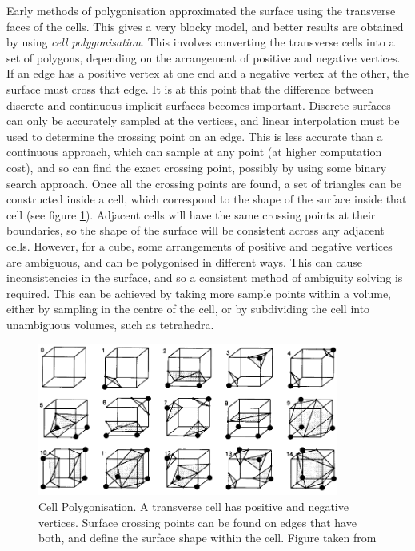 \documentclass[10pt,oneside,fleqn,a4paper]{book}
\begin{document}
Early methods of polygonisation approximated the surface using the transverse faces of the cells. This gives a very blocky model, and better results are obtained by using {\it cell polygonisation}. This involves converting the transverse cells into a set of polygons, depending on the arrangement of positive and negative vertices. If an edge has a positive vertex at one end and a negative vertex at the other, the surface must cross that edge. It is at this point that the difference between discrete and continuous implicit surfaces becomes important. Discrete surfaces can only be accurately sampled at the vertices, and linear interpolation must be used to determine the crossing point on an edge. This is less accurate than a continuous approach, which can sample at any point (at higher computation cost), and so can find the exact crossing point, possibly by using some binary search approach. Once all the crossing points are found, a set of triangles can be constructed inside a cell, which correspond to the shape of the surface inside that cell (see figure \ref{fig:polygonisation}). Adjacent cells will have the same crossing points at their boundaries, so the shape of the surface will be consistent across any adjacent cells. However, for a cube, some arrangements of positive and negative vertices are ambiguous, and can be polygonised in different ways. This can cause inconsistencies in the surface, and so a consistent method of ambiguity solving is required. This can be achieved by taking more sample points within a volume, either by sampling in the centre of the cell, or by subdividing the cell into unambiguous volumes, such as tetrahedra.

\begin{figure}
\begin{center}
\includegraphics[height=5cm]{../images/marchingcubes}
\caption[Cell Polygonisation]{\label{fig:polygonisation} Cell Polygonisation. A transverse cell has positive and negative vertices. Surface crossing points can be found on edges that have both, and define the surface shape within the cell. Figure taken from \cite{Lorensen87}}
\end{center}
\end{figure}
\end{document}
